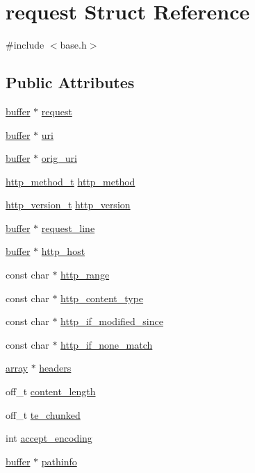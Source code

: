\hypertarget{structrequest}{\section{request Struct Reference}
\label{structrequest}
}


{\ttfamily \#include $<$base.\-h$>$}

\subsection*{Public Attributes}
\begin{DoxyCompactItemize}
\item 
\hyperlink{structbuffer}{buffer} $\ast$ \hyperlink{structrequest_a942d303fc2a108f6de48f61ed9220c78}{request}
\item 
\hyperlink{structbuffer}{buffer} $\ast$ \hyperlink{structrequest_aef1dc716db5d4c8e7a6f9bbe97951ed9}{uri}
\item 
\hyperlink{structbuffer}{buffer} $\ast$ \hyperlink{structrequest_a519fa85bb594758d61f64c770e4f607f}{orig\-\_\-uri}
\item 
\hyperlink{keyvalue_8h_a2fd930fba66817097e73ba9b75800eb2}{http\-\_\-method\-\_\-t} \hyperlink{structrequest_a1166fb8addcfc27011d8d0002761c4a0}{http\-\_\-method}
\item 
\hyperlink{keyvalue_8h_a158a11cca4138c15a22b560bac0d1742}{http\-\_\-version\-\_\-t} \hyperlink{structrequest_a217c1898ea58703de75a50161878c45c}{http\-\_\-version}
\item 
\hyperlink{structbuffer}{buffer} $\ast$ \hyperlink{structrequest_a05bf671b3cc2d2e53f342cb442373a0b}{request\-\_\-line}
\item 
\hyperlink{structbuffer}{buffer} $\ast$ \hyperlink{structrequest_a93886da76208cd2216ef882d52503280}{http\-\_\-host}
\item 
const char $\ast$ \hyperlink{structrequest_aadf126c51c054dc49c0ef3479c264f15}{http\-\_\-range}
\item 
const char $\ast$ \hyperlink{structrequest_ac40920f89b3f58bc9cfa73ea8a2be93d}{http\-\_\-content\-\_\-type}
\item 
const char $\ast$ \hyperlink{structrequest_a4f361bdb4023a9f42e9ef455d63d89cb}{http\-\_\-if\-\_\-modified\-\_\-since}
\item 
const char $\ast$ \hyperlink{structrequest_ac1ffb85ee71c43a64a59606d8f421a07}{http\-\_\-if\-\_\-none\-\_\-match}
\item 
\hyperlink{structarray}{array} $\ast$ \hyperlink{structrequest_ae04f8014a55574a32096fa362c96ba52}{headers}
\item 
off\-\_\-t \hyperlink{structrequest_addd1b722e8c980ee03f5a6339804c6d7}{content\-\_\-length}
\item 
off\-\_\-t \hyperlink{structrequest_a3c6ebab245d7677842e644976fe8c392}{te\-\_\-chunked}
\item 
int \hyperlink{structrequest_a114890880bc3afdcf97168f871106884}{accept\-\_\-encoding}
\item 
\hyperlink{structbuffer}{buffer} $\ast$ \hyperlink{structrequest_a09bbfcfb7c8a31ee832fc42b045003d0}{pathinfo}
\end{DoxyCompactItemize}


